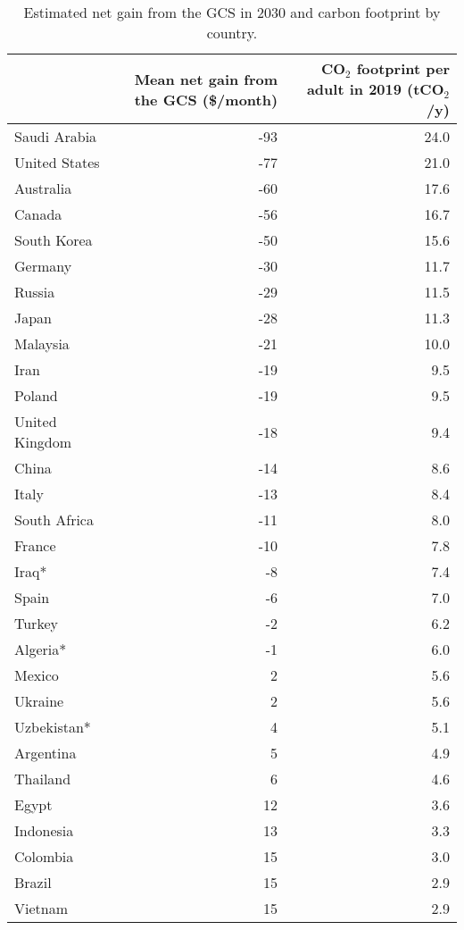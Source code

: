 
\begin{longtable}[t]{lrr}
\caption{\label{tab:gain_gcs.tex}Estimated net gain from the GCS in 2030 and carbon footprint by country.}\\
\toprule
  & \makecell{Mean\\net gain\\from\\the GCS\\(\$/month)} & \makecell{CO$_\text{2}$\\footprint\\per adult\\in 2019\\(tCO$_\text{2}$/y)}\\
\midrule
Saudi Arabia & -93 & 24.0\\
United States & -77 & 21.0\\
Australia & -60 & 17.6\\
Canada & -56 & 16.7\\
South Korea & -50 & 15.6\\
Germany & -30 & 11.7\\
Russia & -29 & 11.5\\
Japan & -28 & 11.3\\
Malaysia & -21 & 10.0\\
Iran & -19 & 9.5\\
Poland & -19 & 9.5\\
United Kingdom & -18 & 9.4\\
China & -14 & 8.6\\
Italy & -13 & 8.4\\
South Africa & -11 & 8.0\\
France & -10 & 7.8\\
Iraq* & -8 & 7.4\\
Spain & -6 & 7.0\\
Turkey & -2 & 6.2\\
Algeria* & -1 & 6.0\\
Mexico & 2 & 5.6\\
Ukraine & 2 & 5.6\\
Uzbekistan* & 4 & 5.1\\
Argentina & 5 & 4.9\\
Thailand & 6 & 4.6\\
Egypt & 12 & 3.6\\
Indonesia & 13 & 3.3\\
Colombia & 15 & 3.0\\
Brazil & 15 & 2.9\\
Vietnam & 15 & 2.9\\

\end{longtable}
